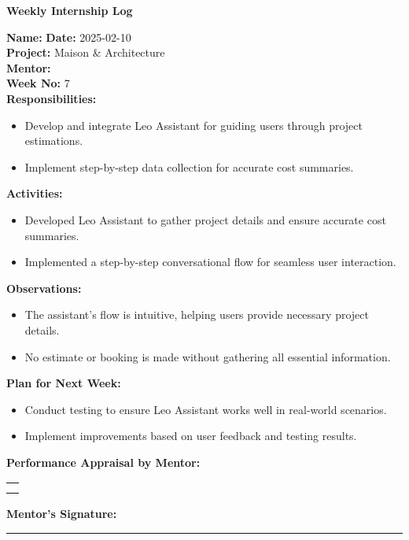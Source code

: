 \begin{center}
    \bfseries Weekly Internship Log
\end{center}

\noindent
\textbf{Name:}  \hfill \textbf{Date:} 2025-02-10 \\
\textbf{Project:} Maison \& Architecture \hfill \\
\textbf{Mentor:}  \\
\textbf{Week No:} 7 \\

\noindent
\textbf{Responsibilities:}
\begin{itemize}
    \item Develop and integrate Leo Assistant for guiding users through project estimations.
    \item Implement step-by-step data collection for accurate cost summaries.
\end{itemize}

\noindent
\textbf{Activities:}
\begin{itemize}
    \item Developed Leo Assistant to gather project details and ensure accurate cost summaries.
    \item Implemented a step-by-step conversational flow for seamless user interaction.
\end{itemize}

\noindent
\textbf{Observations:}
\begin{itemize}
    \item The assistant’s flow is intuitive, helping users provide necessary project details.
    \item No estimate or booking is made without gathering all essential information.
\end{itemize}

\noindent
\textbf{Plan for Next Week:}
\begin{itemize}
    \item Conduct testing to ensure Leo Assistant works well in real-world scenarios.
    \item Implement improvements based on user feedback and testing results.
\end{itemize}

\noindent
\textbf{Performance Appraisal by Mentor:} \\
\begin{table}[h]
    \centering
    \noindent
    \begin{tabularx}{\textwidth} { 
        | >{\centering\arraybackslash}X| }

        \hline
        \\ \\
        \hline
    \end{tabularx}
\end{table}

\vspace{2em}
\noindent
\textbf{Mentor’s Signature:} \\
\rule{0.4\textwidth}{0.5pt}